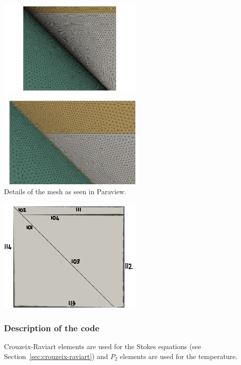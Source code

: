 \begin{center}
\includegraphics[width=7cm]{python_codes/fieldstone_68/images/mesh1}
\includegraphics[width=7cm]{python_codes/fieldstone_68/images/mesh2}\\
{\captionfont Details of the mesh as seen in Paraview.}
\end{center}

\begin{center}
\includegraphics[width=7cm]{python_codes/fieldstone_68/images/interfaces}
\end{center}

\subsubsection*{Description of the code}


Crouzeix-Raviart elements are used for the Stokes equations (see Section~\ref{sec:crouzeix-raviart}) 
and $P_2$ elements are used for the temperature. 

